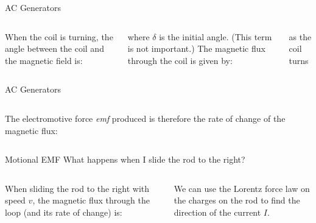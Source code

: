 \documentclass[12pt,aspectratio=169]{beamer}
\begin{document}
\begin{frame}{AC Generators}
  \begin{columns}

    When the coil is turning, the angle between the coil and the magnetic field
    is:
    

    where $\delta$ is the initial angle. (This term is not important.) The
    magnetic flux through the coil is given by:
    
    
    as the coil turns
  \end{columns}
\end{frame}



\begin{frame}{AC Generators}
  \begin{columns}

    The electromotive force \emph{emf} produced is therefore the rate of change
    of the magnetic flux:

  \end{columns}
\end{frame}



\begin{frame}{Motional EMF}
  {What happens when I slide the rod to the right?}
  \begin{columns}

    When sliding the rod to the right with speed $v$, the magnetic flux through
    the loop (and its rate of change) is:

    
    We can use the Lorentz force law on the charges on the rod to find the
    direction of the current $I$.
  \end{columns}
\end{frame}
\end{document}
